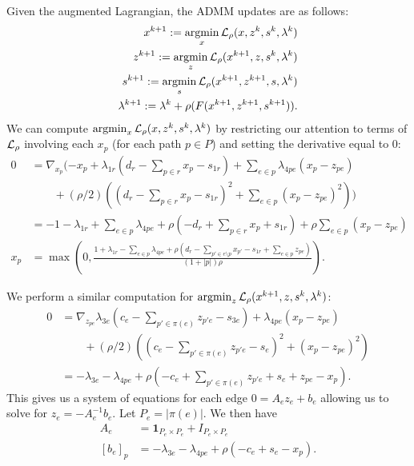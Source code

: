 \documentclass[11pt]{article}
\begin{document}
Given the augmented Lagrangian, the ADMM updates are as follows:
\begin{equation}
    \begin{aligned}
        x^{k+1} := \operatorname*{argmin}_{x} \mathcal{L}_\rho(x,z^k,s^{k},\lambda^k)\\
        z^{k+1} := \operatorname*{argmin}_{z} \mathcal{L}_\rho(x^{k+1},z,s^{k},\lambda^k)\\
        s^{k+1} := \operatorname*{argmin}_{s} \mathcal{L}_\rho(x^{k+1},z^{k+1},s,\lambda^k)\\
        \lambda^{k+1} := \lambda^k + \rho(F(x^{k+1},z^{k+1},s^{k+1})).
    \end{aligned}
\end{equation}
We can compute $\operatorname*{argmin}_{x} \mathcal{L}_\rho(x,z^k,s^k,\lambda^k)$ by restricting our
attention to terms of $\mathcal{L}_\rho$ involving each $x_p$ (for each path $p\in P$)
and setting the derivative equal to 0:
\begin{align*}
0
&= \nabla_{x_p}(-x_p + \lambda_{1r}(d_r - \sum_{p\in r}x_p - s_{1r})
    + \sum_{e\in p}\lambda_{4pe}(x_p - z_{pe})\\
    & \qquad + (\rho/2)((d_r - \sum_{p\in r}x_p - s_{1r})^2 + \sum_{e \in p}(x_p - z_{pe})^2))\\
&= -1 -\lambda_{1r} + \sum_{e \in p}\lambda_{4pe} + \rho(-d_r + \sum_{p\in r}x_p + s_{1r})
    +\rho\sum_{e \in p} (x_p - z_{pe})\\
x_p &= \max(0,\frac{1 + \lambda_{1r} - \sum_{e \in p}\lambda_{4pe}
    + \rho(d_r -\sum_{p'\in e\setminus p} x_{p'}- s_{1r} + \sum_{e\in p} z_{pe})}
{(1+|p|)\rho}).
\end{align*}

We perform a similar computation for $\operatorname*{argmin}_{z} \mathcal{L}_\rho(x^{k+1},z,s^k,\lambda^k)$:
\begin{align*}
0
&= \nabla_{z_{pe}}\lambda_{3e}(c_e - \sum_{p'\in\pi(e)} z_{p'e} - s_{3e})
    + \lambda_{4pe}(x_p - z_{pe})\\
& \qquad + (\rho/2)((c_e - \sum_{p'\in\pi(e)} z_{p'e} - s_e)^2 + (x_p - z_{pe})^2)\\
&= -\lambda_{3e} - \lambda_{4pe}
    + \rho(-c_e + \sum_{p'\in\pi(e)} z_{p'e} + s_e  + z_{pe} - x_p).
\end{align*}
This gives us a system of equations for each edge $0 = A_ez_e + b_e$
allowing us to solve for $z_e = -A_e^{-1}b_e$.
Let $P_e= |\pi(e)|$. We then have
\begin{align*}
A_e &= \mathbf{1}_{P_e\times P_e} + I_{P_e\times P_e}\\
[b_e]_p &= -\lambda_{3e} - \lambda_{4pe}
    + \rho(-c_e + s_e - x_p).
\end{align*}
\end{document}
